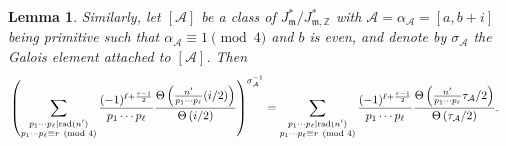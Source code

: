 \documentclass[11pt, reqno]{amsart}
\theoremstyle{plain}
\newtheorem{lemma}[theorem]{Lemma}
\theoremstyle{definition}
\numberwithin{equation}{section}
\begin{document}
\begin{lemma}
   Similarly,  let $[\mathcal{A}]$ be a class  of $J_{\mathfrak{m}}^{*}/J_{\mathfrak{m},\mathbb{Z}}^{*}$ with $\mathcal{A}=\alpha_{\mathcal{A}}=[a,b+i]$ being primitive such that $\alpha_{\mathcal{A}}\equiv1\pmod{4}$ and $b$ is even, and denote by $\sigma_{\mathcal{A}}$ the Galois element attached to $[\mathcal{A}]$. Then
    \begin{align*}
         &\left(\sum_{\substack{p_{1}\cdots p_{\ell}|{\rm rad}(n')\\ p_{1}\cdots p_{\ell}\equiv r\pmod{4}}}\frac{(-1)^{\ell+\frac{r-1}{2}}}{p_{1}\cdots p_{\ell}}\frac{\Theta\left(\frac{n'}{p_{1}\cdots p_{\ell}}(i/2)\right)}{\Theta\left(i/2\right)}\right)^{\sigma_{\mathcal{A}}^{-1}}
         =\sum_{\substack{p_{1}\cdots p_{\ell}|{\rm rad}(n')\\ p_{1}\cdots p_{\ell}\equiv r\pmod{4}}}\frac{(-1)^{\ell+\frac{r-1}{2}}}{p_{1}\cdots p_{\ell}}\frac{\Theta\left(\frac{n'}{p_{1}\cdots p_{\ell}}\tau_{\mathcal{A}}/2\right)}{\Theta\left(\tau_{\mathcal{A}}/2\right)}.
    \end{align*} 
    
\end{lemma}
\end{document}
